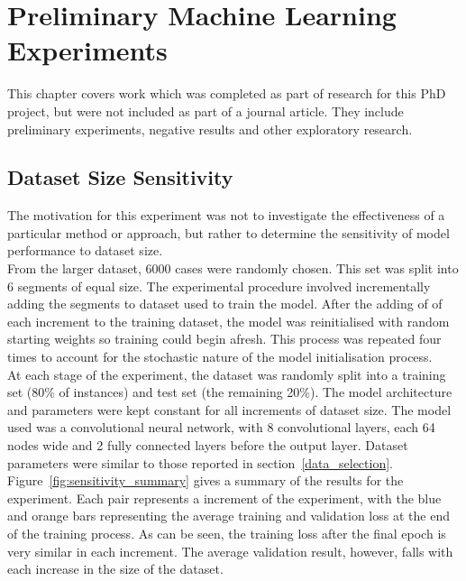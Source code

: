 \chapter{Preliminary Machine Learning Experiments}
\label{cha:preliminary}

This chapter covers work which was completed as part of research for this PhD project, but were not included as part of a journal article. They include preliminary experiments, negative results and other exploratory research. 

\section{Dataset Size Sensitivity}

\noindent The motivation for this experiment was not to investigate the effectiveness of a particular method or approach, but rather to determine the sensitivity of model performance to dataset size. \\

\noindent From the larger dataset, 6000 cases  were randomly chosen. This set was split into 6 segments of equal size. The experimental procedure involved incrementally adding the segments to dataset used to train the model. After the adding of of each increment to the training dataset, the model was reinitialised with random starting weights so training could begin afresh. This process was repeated four times to account for the stochastic nature of the model initialisation process. \\

\noindent At each stage of the experiment, the dataset was randomly split into a training set (80\% of instances) and test set (the remaining 20\%). The model architecture and parameters were kept constant for all increments of dataset size. The model used was a convolutional neural network, with 8 convolutional layers, each 64 nodes wide and 2 fully connected layers before the output layer.  Dataset parameters were similar to those reported in section~\ref{data_selection}.
\\

\noindent 
Figure~\ref{fig:sensitivity_summary} gives a summary of the results for the experiment. Each pair represents a increment of the experiment, with the blue and orange bars representing the average training and validation loss at the end of the training process. As can be seen, the training loss after the final epoch is very similar in each increment. The average validation result, however, falls with each increase in the size of the dataset. \\

